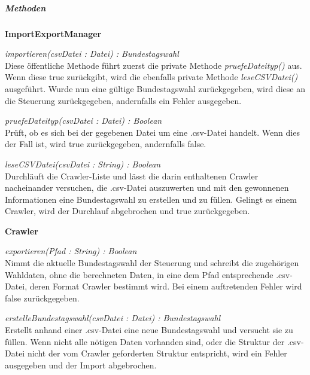 \documentclass[12pt,a4paper,titlepage]{article}
\newcommand{\myma}{\fontfamily{pcr}\selectfont \textbf}
\newcommand{\mymo}{\fontfamily{pcr}\selectfont \textit}
\begin{document}
\subparagraph{Methoden}
\begin{description}
\item{\myma{ImportExportManager}}
\item {\mymo{importieren(csvDatei : Datei) : Bundestagswahl}} \\
Diese öffentliche Methode führt zuerst die private Methode {\mymo{pruefeDateityp()}} aus. Wenn diese true zurückgibt, wird die ebenfalls private Methode {\mymo{leseCSVDatei()}} ausgeführt. Wurde nun eine gültige Bundestagswahl zurückgegeben, wird diese an die Steuerung zurückgegeben, andernfalls ein Fehler ausgegeben.

\item {\mymo{pruefeDateityp(csvDatei : Datei) : Boolean}} \\
Prüft, ob es sich bei der gegebenen Datei um eine .csv-Datei handelt. Wenn dies der Fall ist, wird true zurückgegeben, andernfalls false.

\item {\mymo{leseCSVDatei(csvDatei : String) : Boolean}} \\
Durchläuft die Crawler-Liste und lässt die darin enthaltenen Crawler nacheinander versuchen, die .csv-Datei auszuwerten und mit den gewonnenen Informationen eine Bundestagswahl zu erstellen und zu füllen. Gelingt es einem Crawler, wird der Durchlauf abgebrochen und true zurückgegeben. 

\item{\myma{Crawler}}\\
\item {\mymo{exportieren(Pfad : String) : Boolean}} \\
Nimmt die aktuelle Bundestagswahl der Steuerung und schreibt die zugehörigen Wahldaten, ohne die berechneten Daten, in eine dem Pfad entsprechende .csv-Datei, deren Format Crawler bestimmt wird. Bei einem auftretenden Fehler wird false zurückgegeben.

\item {\mymo{erstelleBundestagswahl(csvDatei : Datei) : Bundestagswahl}} \\
Erstellt anhand einer .csv-Datei eine neue Bundestagswahl und versucht sie zu füllen. Wenn nicht alle nötigen Daten vorhanden sind, oder die Struktur der .csv-Datei nicht der vom Crawler geforderten Struktur entspricht, wird ein Fehler ausgegeben und der Import abgebrochen.
\end{description}

\newpage
\end{document}
